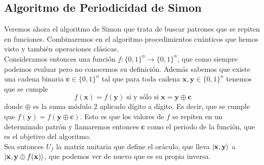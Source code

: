 \documentclass[a4paper]{article}
\numberwithin{equation}{section}
\begin{document}
\begin{figure}[!h]
\end{figure}


\newpage

\subsection{Algoritmo de Periodicidad de Simon}
Veremos ahora el algoritmo de Simon que trata de buscar patrones que se repiten en funciones. Combinaremos en el algoritmo procedimientos cuánticos que hemos visto y también operaciones clásicas.\\
\linebreak
Consideramos entonces una función $f:\{0,1\}^n \longrightarrow \{0,1\}^n$, que como siempre podemos evaluar pero no conocemos su definición. Además sabemos que existe una cadena binaria $\mathbf{c} \in \{0,1\}^n$ tal que para toda cadena $\mathbf{x},\mathbf{y}\in\{0,1\}^n$ tenemos que se cumple
\begin{equation}
f(\mathbf{x}) = f(\mathbf{y}) \; \text{si y sólo si} \; \mathbf{x} = \mathbf{y}\oplus \mathbf{c}
\end{equation}
donde $\oplus$ es la suma módulo 2 aplicado dígito a dígito. Es decir, que se cumple que $f(\mathbf{y}) = f(\mathbf{y}\oplus\mathbf{c})$. Esto es que los valores de $f$ se repiten en un determinado patrón y llamaremos entonces $\mathbf{c}$ como el periodo de la función, que es el objetivo del algoritmo.\\
\linebreak
Sea entonces $U_f$ la matriz unitaria que define el oráculo, que lleva $\ket{\mathbf{x}, \mathbf{y}}$ a $\ket{\mathbf{x}, \mathbf{y}\oplus f(\mathbf{x})}$, que podemos ver de nuevo que es su propia inversa. 
\end{document}
